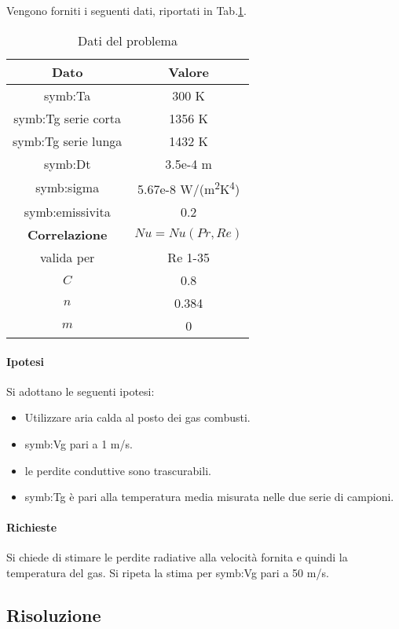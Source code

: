 Vengono forniti i seguenti dati, riportati in Tab.\ref{tab:datiirr}.
\begin{table}[H]
	\centering
	\begin{tabular}{c|c}
		\toprule
		\toprule
		\textbf{Dato} & \textbf{Valore}\\
		\midrule
		\midrule
		\gls{symb:Ta} & 300 K\\
		\midrule
		\gls{symb:Tg} serie corta & 1356 K \\
		\midrule
		\gls{symb:Tg} serie lunga & 1432 K \\
		\midrule
		\gls{symb:Dt} & 3.5e-4 m \\
		\midrule
		\gls{symb:sigma} & 5.67e-8 W/(m\textsuperscript{2}K\textsuperscript{4})\\
		\midrule
		\gls{symb:emissivita} & 0.2 \\
		\midrule
		\midrule
		\textbf{Correlazione} & $ Nu = Nu(Pr,Re) $\\
		valida per & Re 1-35 \\
		\midrule
		$C$ & 0.8 \\
		$n$ & 0.384 \\
		$m$ & 0 \\
		\bottomrule
		\bottomrule
	\end{tabular}
\caption{Dati del problema}
\label{tab:datiirr}
\end{table}

\paragraph{Ipotesi}
Si adottano le seguenti ipotesi:
\begin{itemize}
	\item Utilizzare aria calda al posto dei gas combusti.
	\item \gls{symb:Vg} pari a 1 m/s.
	\item le perdite conduttive sono trascurabili.
	\item \gls{symb:Tg} è pari alla temperatura media misurata nelle due serie di campioni.
\end{itemize}

\paragraph{Richieste}
Si chiede di stimare le perdite radiative alla velocità fornita e quindi la temperatura del gas. Si ripeta la stima per \gls{symb:Vg} pari a 50 m/s. 

\subsection{Risoluzione}